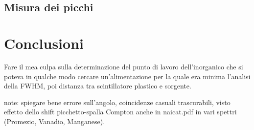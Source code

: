 \documentclass[5pt]{article}
\begin{document}
\subsection{Misura dei picchi} \label{subsec:picchi}



\section{Conclusioni}
Fare il mea culpa sulla determinazione del punto di lavoro dell'inorganico che si poteva in qualche modo cercare un'alimentazione per la quale era minima l'analisi della FWHM, poi distanza tra scintillatore plastico e sorgente.

note:
spiegare bene errore sull'angolo, coincidenze casuali trascurabili, visto effetto dello shift picchetto-spalla Compton anche in naicat.pdf in vari spettri (Promezio, Vanadio, Manganese).


\end{document}

